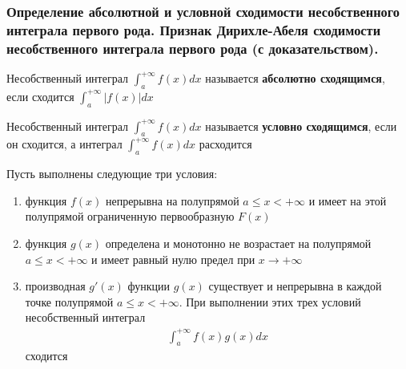 \documentclass[10pt]{article}
\begin{document}
    \subsubsection{Определение абсолютной и условной сходимости несобственного интеграла первого рода. Признак Дирихле-Абеля сходимости несобственного интеграла первого рода (с доказательством).}
    \begin{definition}
        Несобственный интеграл $\int_{a}^{+\infty} f(x) dx$ называется \textbf{абсолютно сходящимся}, если сходится $\int_{a}^{+\infty} |f(x)|dx$
    \end{definition}
    \begin{definition}
        Несобственный интеграл $\int_{a}^{+\infty} f(x) dx$ называется \textbf{условно сходящимся}, если он сходится, а интеграл $\int_{a}^{+\infty} f(x) dx$ расходится 
    \end{definition}
    \begin{theorem}
        Пусть выполнены следующие три условия:
        \begin{enumerate}
            \item функция $f(x)$ непрерывна на полупрямой $a \leq x < +\infty$ и имеет на этой полупрямой ограниченную первообразную $F(x)$
            \item функция $g(x)$ определена и монотонно не возрастает на полупрямой $a \leq x < +\infty$ и имеет равный нулю предел при $x \to +\infty$
            \item производная $g'(x)$ функции $g(x)$ существует и непрерывна в каждой точке полупрямой $a \leq x < +\infty$. При выполнении этих трех условий несобственный интеграл
            \begin{gather}
                \int_{a}^{+\infty} f(x) g(x) dx \label{eq:DA_th}
            \end{gather}
            сходится
        \end{enumerate}
    \end{theorem}
\end{document}
